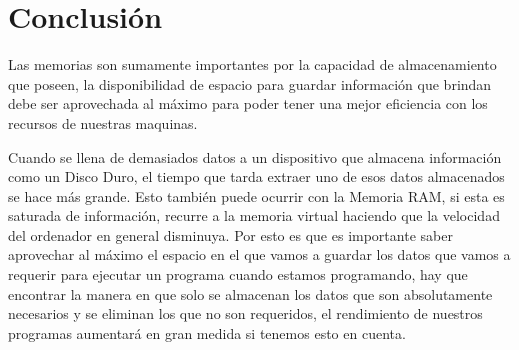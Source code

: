 \documentclass{article}
\begin{document}
\section{Conclusión} \label{conclulsion}

Las memorias son sumamente importantes por la capacidad de almacenamiento que poseen, la disponibilidad de espacio para guardar información que brindan debe ser aprovechada al máximo para poder tener una mejor eficiencia con los recursos de nuestras maquinas.

Cuando se llena de demasiados datos a un dispositivo que almacena información como un Disco Duro, el tiempo que tarda extraer uno de esos datos almacenados se hace más grande. Esto también puede ocurrir con la Memoria RAM, si esta es saturada de información, recurre a la memoria virtual haciendo que la velocidad del ordenador en general disminuya. Por esto es que es importante saber aprovechar al máximo el espacio en el que vamos a guardar los datos que vamos a requerir para ejecutar un programa cuando estamos programando, hay que encontrar la manera en que solo se almacenan los datos que son absolutamente necesarios y se eliminan los que no son requeridos, el rendimiento de nuestros programas aumentará en gran medida si tenemos esto en cuenta. 




\end{document}
